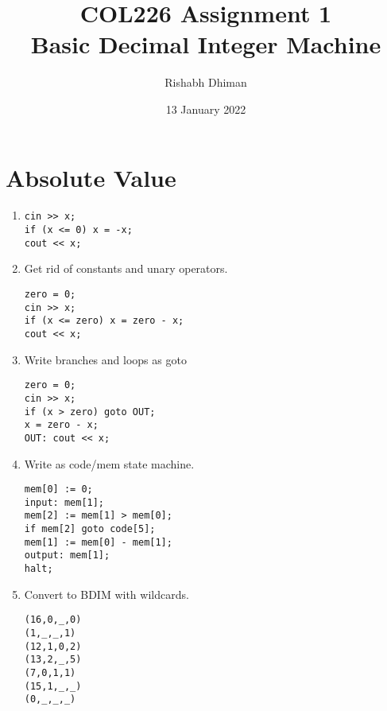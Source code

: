 \documentclass{scrartcl}
\title{
	COL226 Assignment 1\\
	Basic Decimal Integer Machine
}
\date{13 January 2022}
\author{Rishabh Dhiman}
\begin{document}
\maketitle

\section{Absolute Value}

\begin{enumerate}
\item \begin{verbatim}
cin >> x;
if (x <= 0) x = -x;
cout << x;
\end{verbatim}

\item Get rid of constants and unary operators.

\begin{verbatim}
zero = 0;
cin >> x;
if (x <= zero) x = zero - x;
cout << x;
\end{verbatim}

\item Write branches and loops as goto
\begin{verbatim}
zero = 0;
cin >> x;
if (x > zero) goto OUT;
x = zero - x;
OUT: cout << x;
\end{verbatim}

\item Write as code/mem state machine.
\begin{verbatim}
mem[0] := 0;
input: mem[1];
mem[2] := mem[1] > mem[0];
if mem[2] goto code[5];
mem[1] := mem[0] - mem[1];
output: mem[1];
halt;
\end{verbatim}

\item Convert to BDIM with wildcards.
\begin{verbatim}
(16,0,_,0)
(1,_,_,1)
(12,1,0,2)
(13,2,_,5)
(7,0,1,1)
(15,1,_,_)
(0,_,_,_)
\end{verbatim}
\end{enumerate}
\end{document}

